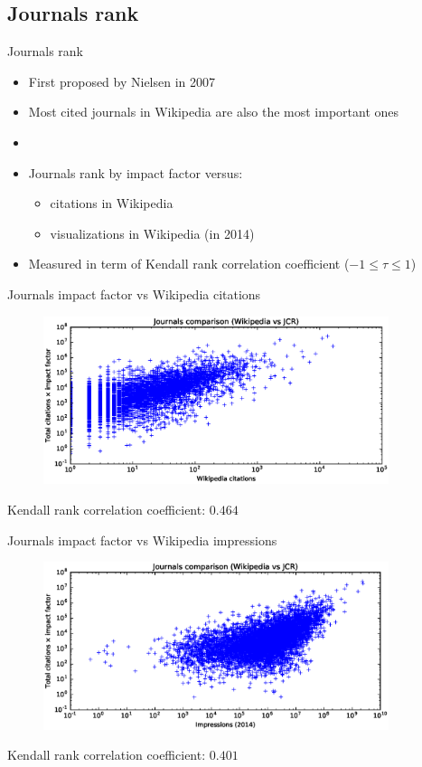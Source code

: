 \documentclass{beamer}
\begin{document}
\subsection{Journals rank}
\begin{frame}{Journals rank}
    \begin{itemize}
        \item First proposed by Nielsen in 2007~\cite{Nielsen2007}
        \item Most cited journals in Wikipedia are also the most important ones
        \item[]
        \item Journals rank by impact factor versus:
        \begin{itemize}
            \item citations in Wikipedia
            \item visualizations in Wikipedia (in 2014)
        \end{itemize}
        \item Measured in term of Kendall rank correlation coefficient ($-1 \le \tau \le 1$)
    \end{itemize}
\end{frame}

\begin{frame}{Journals impact factor vs Wikipedia citations}
    \begin{figure}
    \centering
    \includegraphics[width=0.9\textwidth]{assets/journals_compare_appearances}
    \end{figure}
    \centering
    Kendall rank correlation coefficient: $0.464$
\end{frame}

\begin{frame}{Journals impact factor vs Wikipedia impressions}
    \begin{figure}
    \centering
    \includegraphics[width=0.9\textwidth]{assets/journals_compare_impressions2014}
    \end{figure}
    \centering
    Kendall rank correlation coefficient: $0.401$
\end{frame}
\end{document}
